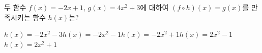 두 함수 $f(x)=-2x+1$, $g(x)=4x^2+3$에 대하여 $(f\circ h)(x)=g(x)$를 만족시키는 함수 $h(x)$는?
\begin{choicesii}{$h(x)=-2x^2-3$}{$h(x)=-2x^2-1$}{$h(x)=-2x^2+1$}{$h(x)=2x^2-1$}{$h(x)=2x^2+1$}\end{choicesii}
